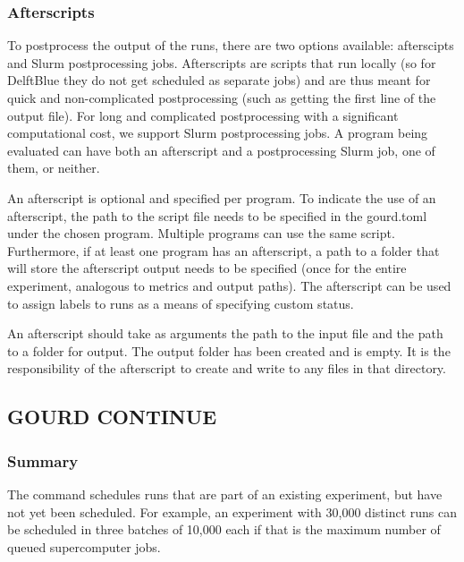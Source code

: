 \documentclass[a4paper,english]{article}
\begin{document}
\begin{adjustwidth}{18pt}{0pt}
                \subsubsection{Afterscripts}
                    To postprocess the output of the runs, there are two options available: afterscipts and Slurm
                    postprocessing jobs. Afterscripts are scripts that run locally (so for DelftBlue they do not
                    get scheduled as separate jobs) and are thus meant for quick and non-complicated postprocessing
                    (such as getting the first line of the output file). For long and complicated postprocessing
                    with a significant computational cost, we support Slurm postprocessing jobs. A program being
                    evaluated can have both an afterscript and a postprocessing Slurm job, one of them, or neither.

                    An afterscript is optional and specified per program. To indicate the use of an afterscript,
                    the path to the script file needs to be specified in the gourd.toml under the chosen program.
                    Multiple programs can use the same script. Furthermore, if at least one program has an
                    afterscript, a path to a folder that will store the afterscript output needs to be specified
                    (once for the entire experiment, analogous to metrics and output paths). The afterscript can
                    be used to assign labels to runs as a means of specifying custom status.

                    An afterscript should take as arguments the path to the input file and the path to a folder
                    for output. The output folder has been created and is empty. It is the responsibility of the
                    afterscript to create and write to any files in that directory.

        \subsection{GOURD CONTINUE}

            \subsubsection{Summary}
                The   command schedules runs that are part of an existing
                experiment, but have not yet been scheduled.
                For example, an experiment with 30,000 distinct runs can be scheduled in three batches
                of 10,000 each if that is the maximum number of queued supercomputer jobs.


\end{adjustwidth}
\end{document}
